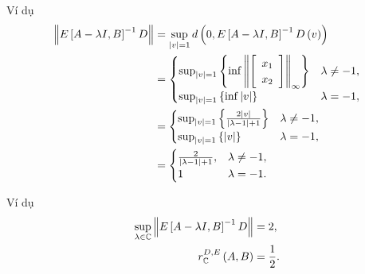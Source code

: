 \begin{frame}{Ví dụ}
    \begin{align}
        \left\lVert E\left[A-\lambda I,B\right]^{-1}D\right\rVert&=\sup_{\left|v\right|=1}d\left(0,E\left[A-\lambda I,B\right]^{-1}D\left(v\right)\right) \nonumber\\
        &=\begin{cases}
        \sup_{\left|v\right|=1}\left\{ \inf\left\lVert\left[\begin{array}{c}
        x_{1}\\
        x_{2}
        \end{array}\right]\right\rVert_{\infty}\right\}  & \lambda\ne-1,\\
        \sup_{\left|v\right|=1}\left\{ \inf\left|v\right|\right\}  & \lambda=-1,
        \end{cases} \nonumber\\
        &=\begin{cases}
        \sup_{\left|v\right|=1}\left\{ \frac{2\left|v\right|}{\left|\lambda-1\right|+1}\right\}  & \lambda\ne-1,\\
        \sup_{\left|v\right|=1}\left\{ \left|v\right|\right\}  & \lambda=-1,
        \end{cases} \nonumber\\
        &=\begin{cases}
        \frac{2}{\left|\lambda-1\right|+1}, & \lambda\ne-1,\\
        1 & \lambda=-1.
        \end{cases}
    \end{align}
\end{frame}


\begin{frame}{Ví dụ}
    \begin{align}
        \sup_{\lambda\in\mathbb{C}}\left\lVert E\left[A-\lambda I,B\right]^{-1}D\right\rVert&=2,\\
        r_{\mathbb{C}}^{D,E}\left(A,B\right)&=\frac{1}{2}.
    \end{align}
\end{frame}



